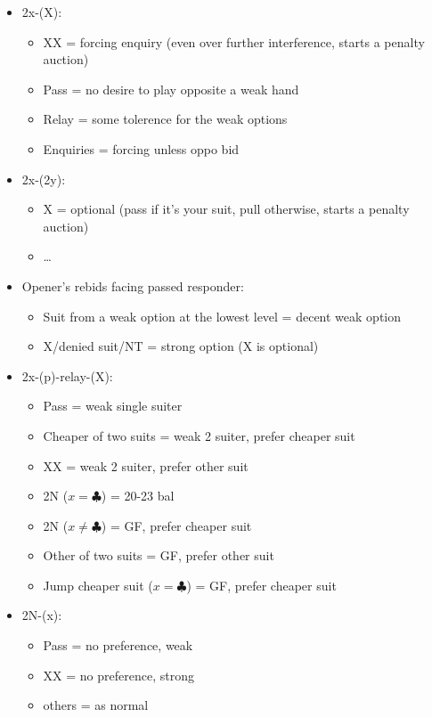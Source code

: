 \documentclass[a4paper,14pt]{extarticle}
\begin{document}
\begin{itemize}
\item 2x-(X):
   \begin{itemize}
      \item XX = forcing enquiry (even over further interference, starts a penalty auction)
      \item Pass = no desire to play opposite a weak hand
      \item Relay = some tolerence for the weak options
      \item Enquiries = forcing unless oppo bid
   \end{itemize}
\newpage
\item 2x-(2y):
   \begin{itemize}
      \item X = optional (pass if it's your suit, pull otherwise, starts a penalty auction)
      \item \ldots
   \end{itemize}
\item Opener's rebids facing passed responder:
   \begin{itemize}
   \item Suit from a weak option at the lowest level = decent weak option
   \item X/denied suit/NT = strong option (X is optional)
   \end{itemize}
\item 2x-(p)-relay-(X):
   \begin{itemize}
	\item Pass = weak single suiter
	\item Cheaper of two suits = weak 2 suiter, prefer cheaper suit
	\item XX = weak 2 suiter, prefer other suit
	\item 2N ($x = \clubsuit$) = 20-23 bal
	\item 2N ($x \neq \clubsuit$) = GF, prefer cheaper suit
	\item Other of two suits = GF, prefer other suit
	\item Jump cheaper suit ($x = \clubsuit$) = GF, prefer cheaper suit
   \end{itemize}
\item 2N-(x):
   \begin{itemize}
	\item Pass = no preference, weak
	\item XX = no preference, strong
	\item others = as normal
   \end{itemize}
\end{itemize}
\end{document}
